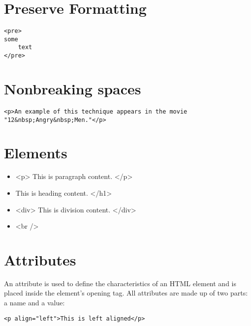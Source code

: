 \documentclass{report}
\begin{document}
    \bigbreak \noindent 
    \section{\LARGE Preserve Formatting}
    \bigbreak \noindent 
\sepline
\begin{verbatim}
<pre>
some 
    text
</pre>
\end{verbatim}
\sepline

    \bigbreak \noindent 
    \section{\LARGE Nonbreaking spaces}
    \bigbreak \noindent 
    \sepline
    \begin{verbatim}
<p>An example of this technique appears in the movie "12&nbsp;Angry&nbsp;Men."</p>
    \end{verbatim}
    \sepline

    \pagebreak \bigbreak \noindent 
    \section{\LARGE Elements}
    \bigbreak \noindent 
    \begin{itemize}
        \item <p> This is paragraph content. </p>
        \item <h1> This is heading content. </h1>
        \item <div> This is division content. </div>
        \item <br />
    \end{itemize}

    \bigbreak \noindent 
    \section{\LARGE Attributes}
    \bigbreak \noindent 
    An attribute is used to define the characteristics of an HTML element and is placed inside the
element's opening tag. All attributes are made up of two parts: a name and a value:
\bigbreak \noindent 
\sepline
\begin{verbatim}
<p align="left">This is left aligned</p>
\end{verbatim}
\sepline

\bigbreak \noindent 
\end{document}
